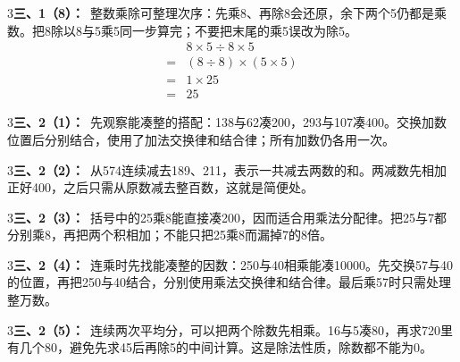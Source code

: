 \documentclass[multi=snippet,border={5bp 20bp 5bp 5bp}]{standalone}
\newenvironment{snippet}[3]{\begin{minipage}{#1bp}\color{answerred}\fontsize{#2}{#3}\selectfont\raggedright}{\end{minipage}}
\begin{document}
\begin{snippet}{505}{11.5}{14}\begin{multicols}{3}\raggedcolumns \textbf{三、1（8）：}\ 整数乘除可整理次序：先乘8、再除8会还原，余下两个5仍都是乘数。把8除以8与5乘5同一步算完；不要把末尾的乘5误改为除5。\[\begin{aligned}&8\times5\div8\times5\\={}&(8\div8)\times(5\times5)\\={}&1\times25\\={}&25\end{aligned}\]\end{multicols}\end{snippet}
\begin{snippet}{505}{11.5}{14}\begin{multicols}{3}\raggedcolumns \textbf{三、2（1）：}\ 先观察能凑整的搭配：138与62凑200，293与107凑400。交换加数位置后分别结合，使用了加法交换律和结合律；所有加数仍各用一次。\end{multicols}\end{snippet}
\begin{snippet}{505}{11.5}{14}\begin{multicols}{3}\raggedcolumns \textbf{三、2（2）：}\ 从574连续减去189、211，表示一共减去两数的和。两减数先相加正好400，之后只需从原数减去整百数，这就是简便处。\end{multicols}\end{snippet}
\begin{snippet}{505}{11.5}{14}\begin{multicols}{3}\raggedcolumns \textbf{三、2（3）：}\ 括号中的25乘8能直接凑200，因而适合用乘法分配律。把25与7都分别乘8，再把两个积相加；不能只把25乘8而漏掉7的8倍。\end{multicols}\end{snippet}
\begin{snippet}{505}{11.5}{14}\begin{multicols}{3}\raggedcolumns \textbf{三、2（4）：}\ 连乘时先找能凑整的因数：250与40相乘能凑10000。先交换57与40的位置，再把250与40结合，分别使用乘法交换律和结合律。最后乘57时只需处理整万数。\end{multicols}\end{snippet}
\begin{snippet}{505}{11.5}{14}\begin{multicols}{3}\raggedcolumns \textbf{三、2（5）：}\ 连续两次平均分，可以把两个除数先相乘。16与5凑80，再求720里有几个80，避免先求45后再除5的中间计算。这是除法性质，除数都不能为0。\end{multicols}\end{snippet}
\end{document}

